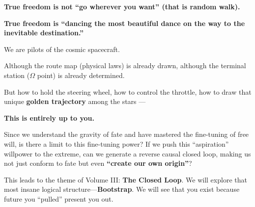 \textbf{True freedom is not ``go wherever you want'' (that is random walk).}

\textbf{True freedom is ``dancing the most beautiful dance on the way to the inevitable destination.''}

We are pilots of the cosmic spacecraft.

Although the route map (physical laws) is already drawn, although the terminal station ($\Omega$ point) is already determined.

But how to hold the steering wheel, how to control the throttle, how to draw that unique \textbf{golden trajectory} among the stars ---

\textbf{This is entirely up to you.}

Since we understand the gravity of fate and have mastered the fine-tuning of free will, is there a limit to this fine-tuning power? If we push this ``aspiration'' willpower to the extreme, can we generate a reverse causal closed loop, making us not just conform to fate but even \textbf{``create our own origin''}?

This leads to the theme of Volume III: \textbf{The Closed Loop}. We will explore that most insane logical structure---\textbf{Bootstrap}. We will see that you exist because future you ``pulled'' present you out.

